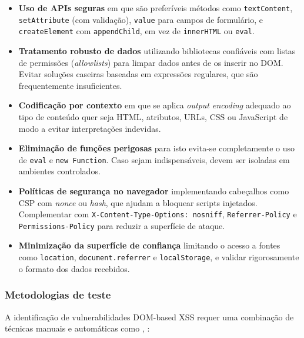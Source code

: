 \begin{itemize}
    \item \textbf{Uso de APIs seguras} em que são preferíveis métodos como \texttt{textContent}, \texttt{setAttribute} (com validação), \texttt{value} para campos de formulário, e \texttt{createElement} com \texttt{appendChild}, em vez de \texttt{innerHTML} ou \texttt{eval}.
    
    \item \textbf{Tratamento robusto de dados} utilizando bibliotecas confiáveis com listas de permissões (\textit{allowlists}) para limpar dados antes de os inserir no DOM. Evitar soluções caseiras baseadas em expressões regulares, que são frequentemente insuficientes.
    
    \item \textbf{Codificação por contexto} em que se aplica \textit{output encoding} adequado ao tipo de conteúdo quer seja HTML, atributos, URLs, CSS ou JavaScript de modo a evitar interpretações indevidas.
    
    \item \textbf{Eliminação de funções perigosas} para isto evita-se completamente o uso de \texttt{eval} e \texttt{new Function}. Caso sejam indispensáveis, devem ser isoladas em ambientes controlados.
    
    \item \textbf{Políticas de segurança no navegador} implementando cabeçalhos como CSP com \textit{nonce} ou \textit{hash}, que ajudam a bloquear scripts injetados. Complementar com \texttt{X-Content-Type-Options: nosniff}, \texttt{Referrer-Policy} e \texttt{Permissions-Policy} para reduzir a superfície de ataque.
    
    \item \textbf{Minimização da superfície de confiança} limitando o acesso a fontes como \texttt{location}, \texttt{document.referrer} e \texttt{localStorage}, e validar rigorosamente o formato dos dados recebidos.
\end{itemize}

\subsubsection{Metodologias de teste}
\label{subsubsec:metodologias-teste-dom-xss}

A identificação de vulnerabilidades DOM-based XSS requer uma combinação de técnicas manuais e automáticas como \cite{ref38}, \cite{ref42}:

